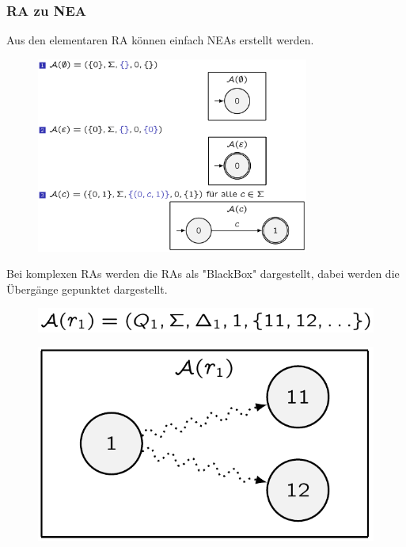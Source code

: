 \documentclass[12pt,a4paper]{article}
\begin{document}
	\subsubsection{RA zu NEA}
	Aus den elementaren RA können einfach NEAs erstellt werden.
	\begin{center}
		\begin{figure}[!h]
			\includegraphics[width=0.8\textwidth]{Bilder/ElementareRAzuDEA.png}
		\end{figure}
	\end{center}
	Bei komplexen RAs werden die RAs als "BlackBox" dargestellt, dabei werden die Übergänge gepunktet dargestellt.

	\begin{center}
		\begin{figure}[!h]
			\includegraphics[width=.7\textwidth]{Bilder/KomplexeRABeispiel.png}
		\end{figure}
	\end{center}

	\begin{center}
		\begin{figure}[!h]
			\includegraphics[width=.7\textwidth]{Bilder/BlackBoxExample.png}
		\end{figure}
	\end{center}
\end{document}
